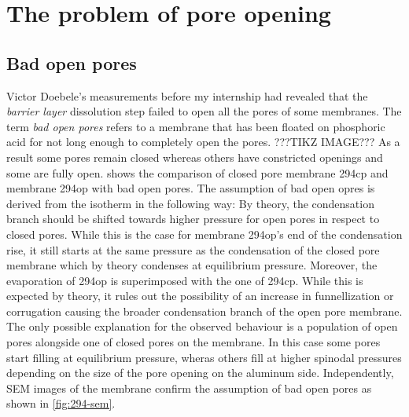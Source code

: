 \documentclass[../thesis.tex]{subfiles}
\begin{document}
  \section{The problem of pore opening}
  \label{sec:opening-problem}


      \subsection{Bad open pores}
      \label{subsec:bad-open-pores}

        

        Victor Doebele's measurements before my internship had revealed that the \textit{barrier layer} dissolution step failed to open all the pores of some membranes. The term \textit{bad open pores} refers to a membrane that has been floated on phosphoric acid for not long enough to completely open the pores. ???TIKZ IMAGE??? As a result some pores remain closed whereas others have constricted openings and some are fully open.  shows the comparison of closed pore membrane 294cp and membrane 294op with bad open pores. The assumption of bad open opres is derived from the isotherm in the following way: By theory, the condensation branch should be shifted towards higher pressure for open pores in respect to closed pores. While this is the case for membrane 294op's end of the condensation rise, it still starts at the same pressure as the condensation of the closed pore membrane which by theory condenses at equilibrium pressure. Moreover, the evaporation of 294op is superimposed with the one of 294cp. While this is expected by theory, it rules out the possibility of an increase in funnellization or corrugation causing the broader condensation branch of the open pore membrane. The only possible explanation for the observed behaviour is a population of open pores alongside one of closed pores on the membrane. In this case some pores start filling at equilibrium pressure, wheras others fill at higher spinodal pressures depending on the size of the pore opening on the aluminum side. Independently, SEM images of the membrane confirm the assumption of bad open pores as shown in \cref{fig:294-sem}.
\end{document}
